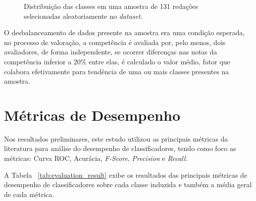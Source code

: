 \begin{figure}[H]
\begin{center}
\caption{Distribuição das classes em uma amostra de 131 redações selecionadas aleatoriamente no \textit{dataset}.}
\label{gra:class_unbundling}
\end{center}
\end{figure}

O desbalanceamento de dados presente na amostra era uma condição esperada, no processo de valoração, a competência é avaliada por, pelo menos, dois avaliadores, de forma independente, se ocorrer diferenças nas notas da competência inferior a 20\% entre elas, é calculado o valor médio, fator que colabora efetivamente para tendência de uma ou mais classes presentes na amostra.

\section{Métricas de Desempenho}

Nos resultados preliminares, este estudo utilizou as principais métricas da literatura para análise do desempenho de classificadores, tendo como foco as métricas: Curva ROC, Acurácia, \textit{F-Score}, \textit{Precision} e \textit{Recall}.

A Tabela ~\ref{tab:evaluation_result} exibe os resultados das principais métricas de desempenho de classificadores sobre cada classe induzida e também a média geral de cada métrica.

